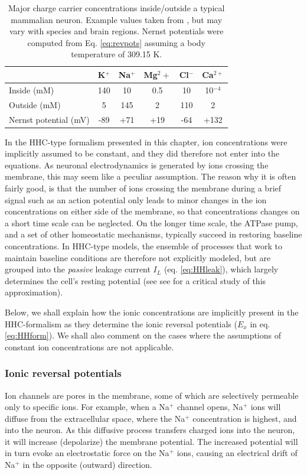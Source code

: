 \begin{table}[h]
\centering
\caption{Major charge carrier concentrations inside/outside a typical mammalian neuron. Example values taken from \cite{Wu2019}, but may vary with species and brain regions. Nernst potentials were computed from Eq. \ref{eq:revpots} assuming a body temperature of 309.15 K.}
\label{table:ion-concentrations}
{\begin{tabular}{lccccc}\toprule
						    & 	K$^+$	&	Na$^+$	&	Mg$^2+$	  &	Cl$^-$	&	Ca$^{2+}$	 \\ \midrule
Inside (mM)				    & 140		&		10	&		0.5	&	10		&  	10$^{-4}$	  	\\
Outside (mM)			           & 5			&		145	&		2	&	110 		&		2		  	\\
Nernst potential (mV)		    &	-89		&	    	+71	&		+19	&	-64		&		+132 		  	\\
\bottomrule
\end{tabular}}{}
\end{table}

In the HHC-type formalism presented in this chapter, ion concentrations were implicitly assumed to be constant, and they did therefore not enter into the equations. As neuronal electrodynamics is generated by ions crossing the membrane, this may seem like a peculiar assumption. The reason why it is often fairly good, is that the number of ions crossing the membrane during a brief signal such as an action potential only leads to minor changes in the ion concentrations on either side of the membrane, so that concentrations changes on a short time scale can be neglected. On the longer time scale, the ATPase pump, and a set of other homeostatic mechanisms,  typically succeed in restoring baseline concentrations. In HHC-type models, the ensemble of processes that work to maintain baseline conditions are therefore not explicitly modeled, but are grouped into the \textit{passive} leakage current $I_L$ (eq. \ref{eq:HHleak}), which largely determines the cell's resting potential (see see \cite{offner1991} for a critical study of this approximation).

Below, we shall explain how the ionic concentrations are implicitly present in the HHC-formalism as they determine the ionic reversal potentials ($E_x$ in eq. \ref{eq:HHform}). We shall also comment on the cases where the assumptions of constant ion concentrations are not applicable. 


\subsubsection{Ionic reversal potentials}
Ion channels are pores in the membrane, some of which are selectively permeable only to specific ions. For example, when a Na$^+$ channel opens, Na$^+$ ions will diffuse from the extracellular space, where the Na$^+$ concentration is highest, and into the neuron. As this diffusive process transfers charged ions into the neuron, it will increase (depolarize) the membrane potential. The increased potential will in turn evoke an electrostatic force on the Na$^+$ ions, causing an electrical drift of Na$^+$ in the opposite (outward) direction. 

